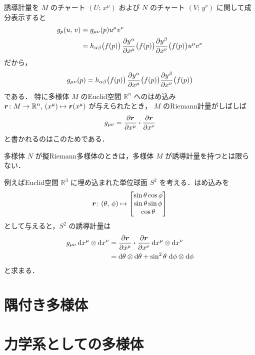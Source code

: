 \documentclass[geometry_main]{subfiles}
\begin{document}
誘導計量を $M$ のチャート $(U;\, x^\mu)$ および $N$ のチャート $(V;\, y^\nu)$ に関して成分表示すると
\begin{align}
	g_p (u,\, v) &= g_{\mu\nu}(p) u^\mu v^\nu\\
	&= h_{\alpha \beta}\bigl( f(p) \bigr)\, \pdv{y^\alpha}{x^\mu}\bigl( f(p) \bigr)\pdv{y^\beta}{x^\nu}\bigl( f(p) \bigr) u^\mu v^\nu
\end{align}
だから，
\begin{align}
	g_{\mu\nu}(p) = h_{\alpha \beta}\bigl( f(p) \bigr)\, \pdv{y^\alpha}{x^\mu}\bigl( f(p) \bigr)\pdv{y^\beta}{x^\nu}\bigl( f(p) \bigr)
\end{align}
である．
特に\cinfty 多様体 $M$ のEuclid空間 $\mathbb{R}^{n}$ へのはめ込み $\vb*{r} \colon M \to \mathbb{R}^{n},\, (x^\mu) \mapsto \vb*{r}(x^\mu)$ が与えられたとき，
$M$ のRiemann計量がしばしば
\begin{align}
	g_{\mu\nu} =  \pdv{\vb*{r}}{x^\mu} \vdot \pdv{\vb*{r}}{x^\nu}
\end{align}
と書かれるのはこのためである．

\begin{marker}
	多様体 $N$ が擬Riemann多様体のときは，多様体 $M$ が誘導計量を持つとは限らない．
\end{marker}

例えばEuclid空間 $\mathbb{R}^3$ に埋め込まれた単位球面 $S^2$ を考える．はめ込みを
\begin{align}
	\vb*{r} \colon (\theta,\, \phi) \mapsto \mqty[\sin \theta \cos\phi \\ \sin\theta \sin \phi \\ \cos \theta]
\end{align}
として与えると，$S^2$ の誘導計量は
\begin{align}
	g_{\mu\nu} \dd{x^\mu} \otimes \dd{x^\nu} &= \pdv{\vb*{r}}{x^\mu} \vdot \pdv{\vb*{r}}{x^\nu} \dd{x^\mu} \otimes \dd{x^\nu} \\
	&= \dd{\theta} \otimes \dd{\theta} + \sin^2 \theta\, \dd{\phi} \otimes \dd{\phi}
\end{align}
と求まる．

\section{隅付き多様体}


\section{力学系としての多様体}
\end{document}
